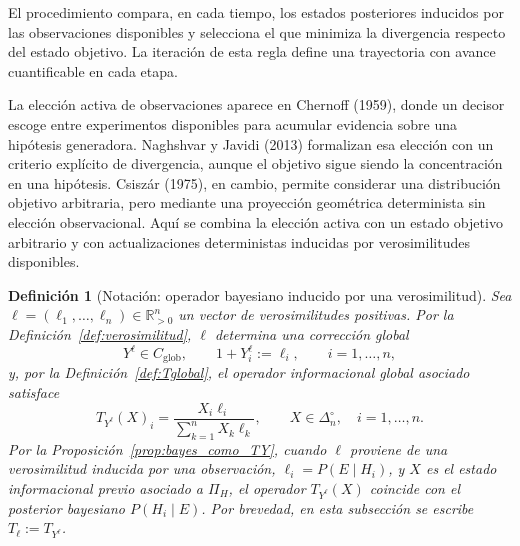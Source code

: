 \documentclass[12pt]{article}
\newtheorem{definicion}{Definición}[section]
\begin{document}
El procedimiento compara, en cada tiempo, los estados posteriores inducidos por las observaciones disponibles y selecciona el que minimiza la divergencia respecto del estado objetivo. La iteración de esta regla define una trayectoria con avance cuantificable en cada etapa.

La elección activa de observaciones aparece en Chernoff (1959), donde un decisor escoge entre experimentos disponibles para acumular evidencia sobre una hipótesis generadora. Naghshvar y Javidi (2013) formalizan esa elección con un criterio explícito de divergencia, aunque el objetivo sigue siendo la concentración en una hipótesis. Csiszár (1975), en cambio, permite considerar una distribución objetivo arbitraria, pero mediante una proyección geométrica determinista sin elección observacional. Aquí se combina la elección activa con un estado objetivo arbitrario y con actualizaciones deterministas inducidas por verosimilitudes disponibles.


\begin{definicion}[Notación: operador bayesiano inducido por una verosimilitud]\label{def:Tell_trayectorias}
Sea \(\ell=(\ell_1,\dots,\ell_n)\in\mathbb R_{>0}^n\) un vector de verosimilitudes positivas. Por la Definición~\ref{def:verosimilitud}, \(\ell\) determina una corrección global
\[
Y^\ell\in C_{\mathrm{glob}},
\qquad
1+Y_i^\ell:=\ell_i,
\qquad i=1,\dots,n,
\]
y, por la Definición~\ref{def:Tglobal}, el operador informacional global asociado satisface
\[
T_{Y^\ell}(X)_i
=
\frac{X_i\ell_i}{\sum_{k=1}^n X_k\ell_k},
\qquad X\in\Delta_n^\circ,\quad i=1,\dots,n.
\]
Por la Proposición~\ref{prop:bayes_como_TY}, cuando \(\ell\) proviene de una verosimilitud inducida por una observación, \(\ell_i=P(E\mid H_i)\), y \(X\) es el estado informacional previo asociado a \(\Pi_H\), el operador \(T_{Y^\ell}(X)\) coincide con el posterior bayesiano \(P(H_i\mid E)\). Por brevedad, en esta subsección se escribe \(T_\ell:=T_{Y^\ell}\).
\end{definicion}
\end{document}
